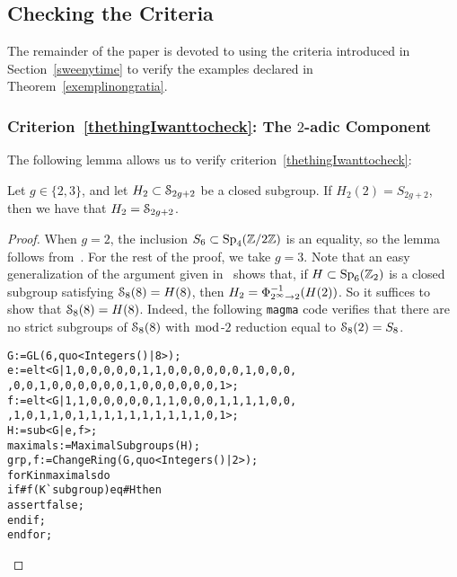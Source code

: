 \subsection{Checking the Criteria}\label{icheckthat}

The remainder of the paper is devoted to using the criteria introduced in Section~\ref{sweenytime} to verify the examples declared in Theorem~\ref{exemplinongratia}.


\subsubsection{Criterion~\eqref{thethingIwanttocheck}: The $2$-adic Component} \label{subsection:2-adic}

The following lemma allows us to verify criterion~\eqref{thethingIwanttocheck}:

\begin{lemma} \label{lemma:2-adic}
	Let $g \in \{2,3\}$, and let $H_2 \subset \mathcal S_{2g+2}$ be a closed subgroup. If $H_2(2) = S_{2g+2}$, then we have that $H_2 = \mathcal S_{2g+2}$. 
\end{lemma} 
\begin{proof} 
	When $g = 2$, the inclusion $S_6 \subset \operatorname{Sp}_4({\mathbb Z} / 2 {\mathbb Z})$ is an equality, so the lemma follows from~\cite[Theorem 1]{landesman-swaminathan-tao-xu:lifting-symplectic-group}. For the rest of the proof, we take $g = 3$. Note that an easy generalization of the argument given in~\cite[Lemma 3, Section IV.3.4]{serre1989abelian} shows that, if $H \subset \operatorname{Sp}_{6}(\mathbb Z_2)$ is a closed subgroup satisfying $\mathcal S_{8}(8) = H(8)$, then $H_2 = \Phi_{2^{\infty} \to 2}^{-1}(H(2))$.
So it suffices to show that
$\mathcal S_{8}(8) = H(8)$.
	Indeed, the following \texttt{magma} code verifies that there are no strict subgroups of
$\mathcal S_{8}(8)$ with $\bmod$-$2$ reduction equal to
$\mathcal S_{8}(2) = S_{8}$.
\vspace*{0.1in}
\begin{adjustwidth}{0.5in}{0in}
\begin{alltt}
G := GL(6,quo<Integers()|8>);
e := elt<G| 1,0,0,0,0,0,1,1,0,0,0,0,0,0,1,0,0,0,
,0,0,1,0,0,0,0,0,0,1,0,0,0,0,0,0,1>;
f := elt<G|1,1,0,0,0,0,0,1,1,0,0,0,1,1,1,1,0,0, 
,1,0,1,1,0,1,1,1,1,1,1,1,1,1,1,0,1>;
H := sub<G|e,f>;
maximals := MaximalSubgroups(H);
grp, f := ChangeRing(G, quo<Integers()|2>);
for K in maximals do
    if #f(K{\`{}}subgroup) eq #H then
        assert false;
    end if;
end for; \qedhere
\end{alltt}
\end{adjustwidth}
\end{proof}

